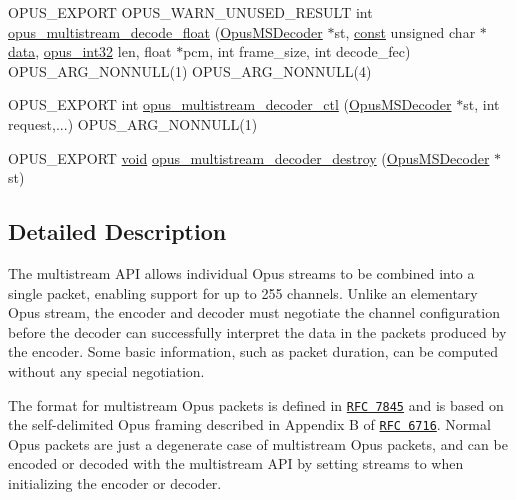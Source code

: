 \begin{DoxyCompactItemize}
\item 
O\+P\+U\+S\+\_\+\+E\+X\+P\+O\+RT O\+P\+U\+S\+\_\+\+W\+A\+R\+N\+\_\+\+U\+N\+U\+S\+E\+D\+\_\+\+R\+E\+S\+U\+LT int \hyperlink{group__opus__multistream_ga32b004586f69b063a447e123e6a2c151}{opus\+\_\+multistream\+\_\+decode\+\_\+float} (\hyperlink{group__opus__multistream_gad3497495deb9a8ace82e76cd4f93e0e4}{Opus\+M\+S\+Decoder} $\ast$st, \hyperlink{zconf_8h_a2c212835823e3c54a8ab6d95c652660e}{const} unsigned char $\ast$\hyperlink{jpeglib_8h_aa379dc8ae39e55ae0c431a61a7d2f2bc}{data}, \hyperlink{opus__types_8h_aa4d309d6f80b99dbabebc8f98879ab9a}{opus\+\_\+int32} len, float $\ast$pcm, int frame\+\_\+size, int decode\+\_\+fec) O\+P\+U\+S\+\_\+\+A\+R\+G\+\_\+\+N\+O\+N\+N\+U\+LL(1) O\+P\+U\+S\+\_\+\+A\+R\+G\+\_\+\+N\+O\+N\+N\+U\+LL(4)
\item 
O\+P\+U\+S\+\_\+\+E\+X\+P\+O\+RT int \hyperlink{group__opus__multistream_ga3c6402c3bb276d7a152d9934ce948431}{opus\+\_\+multistream\+\_\+decoder\+\_\+ctl} (\hyperlink{group__opus__multistream_gad3497495deb9a8ace82e76cd4f93e0e4}{Opus\+M\+S\+Decoder} $\ast$st, int request,...) O\+P\+U\+S\+\_\+\+A\+R\+G\+\_\+\+N\+O\+N\+N\+U\+LL(1)
\item 
O\+P\+U\+S\+\_\+\+E\+X\+P\+O\+RT \hyperlink{png_8h_ac9c84fa68bbad002983e35ce3663c686}{void} \hyperlink{group__opus__multistream_ga314b439b06efd9463caa5039c1198f6c}{opus\+\_\+multistream\+\_\+decoder\+\_\+destroy} (\hyperlink{group__opus__multistream_gad3497495deb9a8ace82e76cd4f93e0e4}{Opus\+M\+S\+Decoder} $\ast$st)
\end{DoxyCompactItemize}


\subsection{Detailed Description}
The multistream A\+PI allows individual Opus streams to be combined into a single packet, enabling support for up to 255 channels. Unlike an elementary Opus stream, the encoder and decoder must negotiate the channel configuration before the decoder can successfully interpret the data in the packets produced by the encoder. Some basic information, such as packet duration, can be computed without any special negotiation.

The format for multistream Opus packets is defined in \href{https://tools.ietf.org/html/rfc7845}{\tt R\+FC 7845} and is based on the self-\/delimited Opus framing described in Appendix B of \href{https://tools.ietf.org/html/rfc6716}{\tt R\+FC 6716}. Normal Opus packets are just a degenerate case of multistream Opus packets, and can be encoded or decoded with the multistream A\+PI by setting {\ttfamily streams} to {} when initializing the encoder or decoder.

